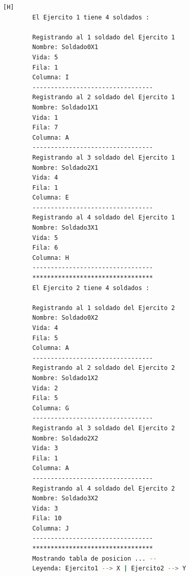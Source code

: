 \documentclass{article}
\begin{document}
	\begin{lstlisting}[language=bash,caption={La ejecución: \textcolor{red}{PARA PODER VER LA TABLA COMPLETAMENTE MIRAR LA PLANTILLA DE LATEX O EJECUTARLO: }}][H]
		El Ejercito 1 tiene 4 soldados : 

		Registrando al 1 soldado del Ejercito 1
		Nombre: Soldado0X1
		Vida: 5
		Fila: 1
		Columna: I
		---------------------------------
		Registrando al 2 soldado del Ejercito 1
		Nombre: Soldado1X1
		Vida: 1
		Fila: 7
		Columna: A
		---------------------------------
		Registrando al 3 soldado del Ejercito 1
		Nombre: Soldado2X1
		Vida: 4
		Fila: 1
		Columna: E
		---------------------------------
		Registrando al 4 soldado del Ejercito 1
		Nombre: Soldado3X1
		Vida: 5
		Fila: 6
		Columna: H
		---------------------------------
		*********************************
		El Ejercito 2 tiene 4 soldados : 
		
		Registrando al 1 soldado del Ejercito 2
		Nombre: Soldado0X2
		Vida: 4
		Fila: 5
		Columna: A
		---------------------------------
		Registrando al 2 soldado del Ejercito 2
		Nombre: Soldado1X2
		Vida: 2
		Fila: 5
		Columna: G
		---------------------------------
		Registrando al 3 soldado del Ejercito 2
		Nombre: Soldado2X2
		Vida: 3
		Fila: 1
		Columna: A
		---------------------------------
		Registrando al 4 soldado del Ejercito 2
		Nombre: Soldado3X2
		Vida: 3
		Fila: 10
		Columna: J
		---------------------------------
		*********************************
		Mostrando tabla de posicion ... --
		Leyenda: Ejercito1 --> X | Ejercito2 --> Y
		

\end{lstlisting}
\end{document}
